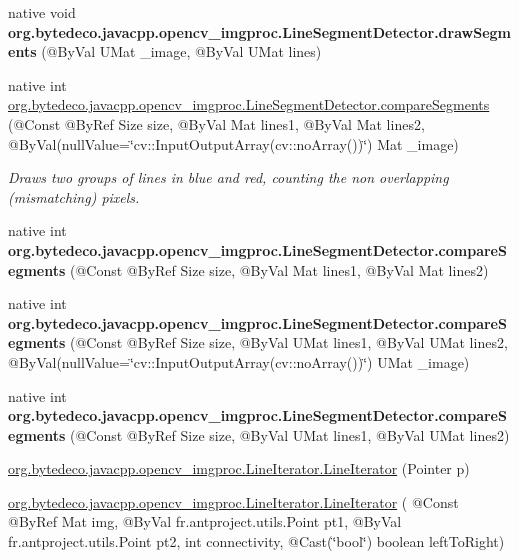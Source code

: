 \begin{DoxyCompactItemize}
native void {\bfseries org.\+bytedeco.\+javacpp.\+opencv\+\_\+imgproc.\+Line\+Segment\+Detector.\+draw\+Segments} (@By\+Val U\+Mat \+\_\+image, @By\+Val U\+Mat lines)
\item 
native int \hyperlink{group__imgproc_ga5d2746803c6bf8d765754a7523f8f09b}{org.\+bytedeco.\+javacpp.\+opencv\+\_\+imgproc.\+Line\+Segment\+Detector.\+compare\+Segments} (@Const @By\+Ref Size size, @By\+Val Mat lines1, @By\+Val Mat lines2, @By\+Val(null\+Value=\char`\"{}cv\+::\+Input\+Output\+Array(cv\+::no\+Array())\char`\"{}) Mat \+\_\+image)
\begin{DoxyCompactList}\small\item\em Draws two groups of lines in blue and red, counting the non overlapping (mismatching) pixels. \end{DoxyCompactList}\item 
\mbox{\label{group__imgproc_ga38a2e400c1b043016accdedf1483b6d5}} 
native int {\bfseries org.\+bytedeco.\+javacpp.\+opencv\+\_\+imgproc.\+Line\+Segment\+Detector.\+compare\+Segments} (@Const @By\+Ref Size size, @By\+Val Mat lines1, @By\+Val Mat lines2)
\item 
\mbox{\label{group__imgproc_ga02458163e899048a4811bdf4723537f9}} 
native int {\bfseries org.\+bytedeco.\+javacpp.\+opencv\+\_\+imgproc.\+Line\+Segment\+Detector.\+compare\+Segments} (@Const @By\+Ref Size size, @By\+Val U\+Mat lines1, @By\+Val U\+Mat lines2, @By\+Val(null\+Value=\char`\"{}cv\+::\+Input\+Output\+Array(cv\+::no\+Array())\char`\"{}) U\+Mat \+\_\+image)
\item 
\mbox{\label{group__imgproc_gabeef7c1e98a7268dc25e18f5a0959104}} 
native int {\bfseries org.\+bytedeco.\+javacpp.\+opencv\+\_\+imgproc.\+Line\+Segment\+Detector.\+compare\+Segments} (@Const @By\+Ref Size size, @By\+Val U\+Mat lines1, @By\+Val U\+Mat lines2)
\item 
\hyperlink{group__imgproc_gab596cb042f00fd0833e914b7ea024342}{org.\+bytedeco.\+javacpp.\+opencv\+\_\+imgproc.\+Line\+Iterator.\+Line\+Iterator} (Pointer p)
\item 
\hyperlink{group__imgproc_ga56929bab5a89ba1c9bc2e00073eaedb4}{org.\+bytedeco.\+javacpp.\+opencv\+\_\+imgproc.\+Line\+Iterator.\+Line\+Iterator} ( @Const @By\+Ref Mat img, @By\+Val fr.antproject.utils.Point pt1, @By\+Val fr.antproject.utils.Point pt2, int connectivity, @Cast(\char`\"{}bool\char`\"{}) boolean left\+To\+Right)

\end{DoxyCompactItemize}
